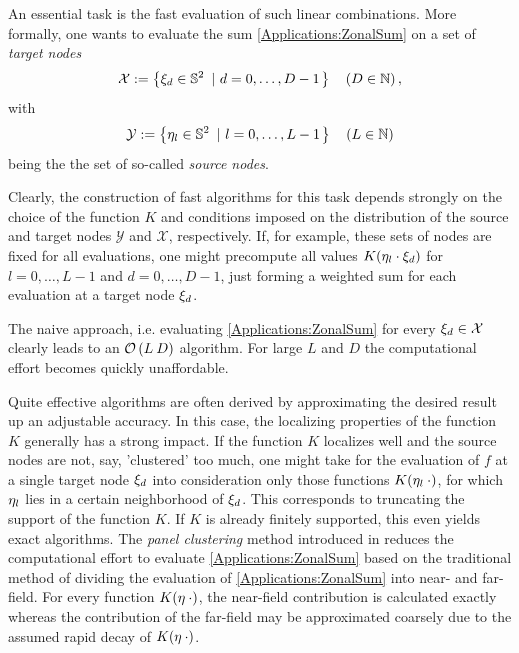 An essential task is the fast evaluation of such linear combinations. More formally, 
one wants to evaluate the sum \eqref{Applications:ZonalSum}
on a set of \emph{target nodes} 
$$
  \mathcal{X} := \left\{\mathbf{\xi}_{d} \in \mathbb{S}^2\ \left|\ d=0,\ldots,D-1\right.\right\rbrace \quad \left(D \in \mathbb{N}\right),
$$ 
with 
$$
  \mathcal{Y} := \left\{\mathbf{\eta}_{l} \in \mathbb{S}^2\ \left|\ l = 0,\ldots,L-1\right.\right\rbrace \quad \left(L \in \mathbb{N}\right)
$$
being the the set of so-called \emph{source nodes}.

Clearly, the construction of fast algorithms for this task depends strongly on the
choice of the function $K$ and conditions imposed on the distribution of the 
source and target nodes $\mathcal{Y}$ and $\mathcal{X}$, respectively.
If, for example, these sets of nodes are fixed for all evaluations, one might 
precompute all values $ K{\hspace{-0.4ex}}\left(\mathbf{\eta}_{l}\cdot\mathbf{\xi}_{d}\right)$ for $l=0,\ldots,L-1$ and 
$d=0,\ldots,D-1$, just forming a weighted sum for each evaluation at a target node 
$\mathbf{\xi}_{d}$.

The naive approach, i.e. evaluating \eqref{Applications:ZonalSum} for every $\mathbf{\xi}_{d} 
\in \mathcal{X}$ clearly leads to an $\mathcal{O}\left(L\:D\right)$ algorithm. For large $L$ and $D$ the 
computational effort becomes quickly unaffordable.

Quite effective algorithms are often derived by approximating the desired result 
up an adjustable accuracy. In this case, the localizing properties of the function $K$ 
generally has a strong impact. If the function $K$ localizes well and the source nodes 
are not, say, 'clustered' too much, one might take for the evaluation of $f$ at a single target 
node $\mathbf{\xi}_{d}$ into consideration only those functions $K{\hspace{-0.4ex}}\left(\mathbf{\eta}_{l}\:\cdot\right)$, for
which $\mathbf{\eta}_{l}$ lies in a certain neighborhood of $\mathbf{\xi}_{d}$. This corresponds to 
truncating the support of the function $K$. If $K$ is already finitely supported, this even
yields exact algorithms. 
The \emph{panel clustering} method introduced in \cite{FrGlSch98} reduces the computational 
effort to evaluate \eqref{Applications:ZonalSum} based on the traditional method of dividing 
the evaluation of \eqref{Applications:ZonalSum} into near- and far-field. For every function
$K{\hspace{-0.4ex}}\left(\mathbf{\eta} \: \cdot\right)$, the near-field contribution is calculated exactly whereas the 
contribution of the far-field may be approximated coarsely due to the assumed rapid decay 
of $K{\hspace{-0.4ex}}\left(\mathbf{\eta} \: \cdot\right)$. 

